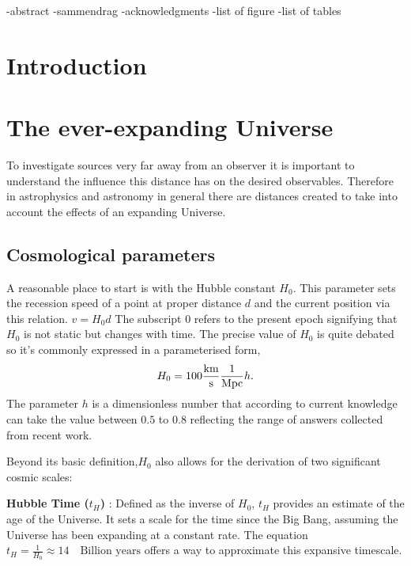 \documentclass{article}
\begin{document}
\newpage
\tableofcontents

\newpage
\listoffigures

\listoftables

-abstract 
-sammendrag
-acknowledgments
-list of figure
-list of tables

\newpage


\section{Introduction}


\section{The ever-expanding Universe}
To investigate sources very far away from an observer it is important to understand the influence this distance 
has on the desired observables. Therefore in astrophysics and astronomy in general there are distances created to take into account the effects of an expanding Universe. 


\subsection{Cosmological parameters}

A reasonable place to start is with the Hubble constant $H_0$. 
This parameter sets the recession speed of a point at proper distance $d$ and the current position via this relation. $v = H_0 d$ 
The subscript $0$ refers to the present epoch signifying that $H_0$ is not static but changes with time. 
The precise value of $H_0$ is quite debated so it's commonly expressed in a parameterised form,
$$
H_0= 100\frac{\rm km}{\rm s}\frac{1}{\rm Mpc} h.
$$
The parameter $h$ is a dimensionless number that according to current knowledge can take the value between $0.5$ to $0.8$ reflecting the range of answers collected from recent work. 

Beyond its basic definition,$H_0$ also allows for the derivation of two significant cosmic scales:

\textbf{Hubble Time ($t_H$) }: Defined as the inverse of 
$H_0$, $t_H$ provides an estimate of the age of the Universe. 
It sets a scale for the time since the Big Bang, assuming the Universe has been expanding at a constant rate. The equation 
$t_H = \frac{1}{H_0} \approx 14 \quad \text{Billion years}$ offers a way to approximate this expansive timescale.
\end{document}
